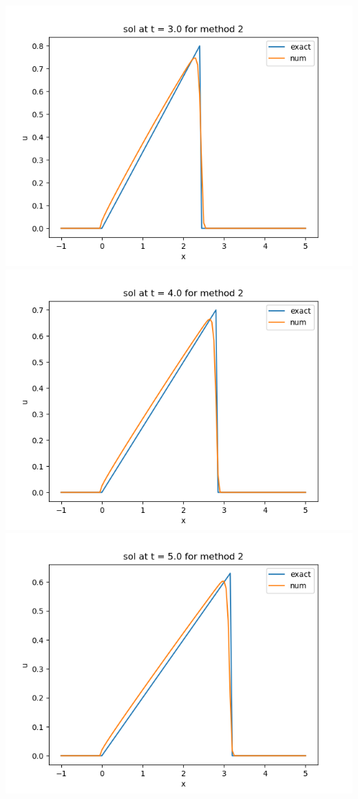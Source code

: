 \documentclass{article}
\begin{document}
\begin{center}
	\includegraphics[scale=.23]{hw13 sol t = 3 method 2}
	\includegraphics[scale=.3]{hw13 sol t = 4 method 2}
	\includegraphics[scale=.3]{hw13 sol t = 5 method 2}

\end{center}
\end{document}
